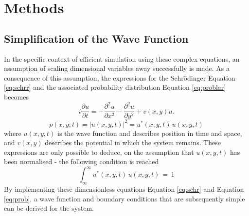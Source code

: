 \documentclass[10pt, nofootinbib, twocolumn]{revtex4-1}
\begin{document}
\newpage
\section{Methods}\label{sec:methods} 
\subsection{Simplification of the Wave Function}
In the specific context of efficient simulation using these complex equations, an assumption of scaling dimensional variables away successfully is made. As a consequence of this assumption, the expressions for the Schrödinger Equation \eqref{eq:schrr} and the associated probability distribution Equation \eqref{eq:problar} becomes 
\begin{equation}\label{eq:schr}
    i \frac{\partial u}{\partial t} = -\frac{\partial^2 u}{\partial x^2} - \frac{\partial^2 u}{\partial y^2} + v(x,y) u.
\end{equation}
\begin{equation}\label{eq:prob}
    p(x,y;t) = |u(x,y,t)|^2 = u^*(x,y,t) \, u(x,y,t)
\end{equation}
where $u(x,y,t)$ is the wave function and describes position in time and space, and $v(x,y)$ describes the potential in which the system remains. These expressions are only possible to deduce, on the assumption that $u(x,y,t)$ has been normalised \cite{griffiths} - the following condition is reached
\begin{equation}\label{eq:norm}
    \int_{\infty}^{\infty}{u^*(x,y,t) \, u(x,y,t)} \, = \, 1
\end{equation}
By implementing these dimensionless equations Equation \eqref{eq:schr} and Equation \eqref{eq:prob}, a wave function and boundary conditions that are subsequently simple can be derived for the system. 
\end{document}
